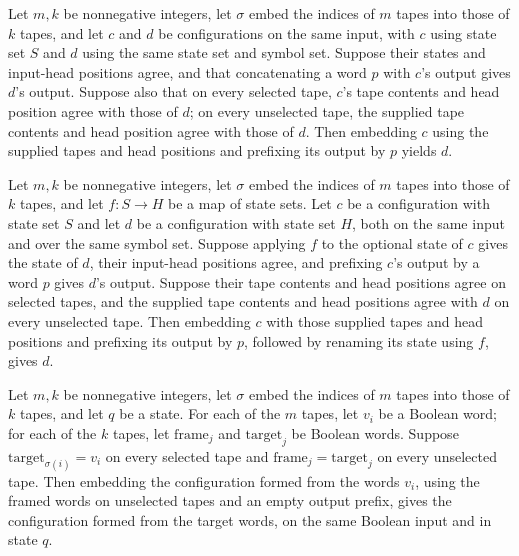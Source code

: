 \begin{theorem}
\label{Turing.embedEmitCfg_eq}
\leanok
{}
Let $m,k$ be nonnegative integers, let $\sigma$ embed the indices of $m$ tapes into
those of $k$ tapes, and let $c$ and $d$ be configurations on the same input, with $c$
using state set $S$ and $d$ using the same state set and symbol set. Suppose their
states and input-head positions agree, and that concatenating a word $p$ with $c$'s
output gives $d$'s output. Suppose also that on every selected tape, $c$'s tape contents
and head position agree with those of $d$; on every unselected tape, the supplied tape
contents and head position agree with those of $d$. Then embedding $c$ using the
supplied tapes and head positions and prefixing its output by $p$ yields $d$.
\end{theorem}

\begin{theorem}
\label{Turing.embedEmitCfg_mapState_eq}
\leanok
{}
Let $m,k$ be nonnegative integers, let $\sigma$ embed the indices of $m$ tapes into
those of $k$ tapes, and let $f:S\to H$ be a map of state sets. Let $c$ be a
configuration with state set $S$ and let $d$ be a configuration with state set $H$, both
on the same input and over the same symbol set. Suppose applying $f$ to the optional
state of $c$ gives the state of $d$, their input-head positions agree, and prefixing
$c$'s output by a word $p$ gives $d$'s output. Suppose their tape contents and head
positions agree on selected tapes, and the supplied tape contents and head positions
agree with $d$ on every unselected tape. Then embedding $c$ with those supplied tapes
and head positions and prefixing its output by $p$, followed by renaming its state using
$f$, gives $d$.
\end{theorem}

\begin{theorem}
\label{Turing.embedEmitCfg_ofWords_eq}
\leanok
{}
Let $m,k$ be nonnegative integers, let $\sigma$ embed the indices of $m$ tapes into
those of $k$ tapes, and let $q$ be a state. For each of the $m$ tapes, let $v_i$ be a
Boolean word; for each of the $k$ tapes, let $\mathrm{frame}_j$ and $\mathrm{target}_j$
be Boolean words. Suppose $\mathrm{target}_{\sigma(i)}=v_i$ on every selected tape and
$\mathrm{frame}_j=\mathrm{target}_j$ on every unselected tape. Then embedding the
configuration formed from the words $v_i$, using the framed words on unselected tapes
and an empty output prefix, gives the configuration formed from the target words, on the
same Boolean input and in state $q$.
\end{theorem}

